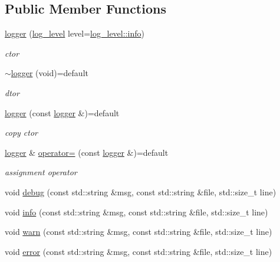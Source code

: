 \subsection*{Public Member Functions}
\begin{DoxyCompactItemize}
\item 
\hyperlink{classtacopie_1_1logger_af863301c0ef7f646469eb944285cb280}{logger} (\hyperlink{classtacopie_1_1logger_ae7dd235972bbf86a017fc39b3af80efe}{log\+\_\+level} level=\hyperlink{classtacopie_1_1logger_ae7dd235972bbf86a017fc39b3af80efeacaf9b6b99962bf5c2264824231d7a40c}{log\+\_\+level\+::info})
\begin{DoxyCompactList}\small\item\em ctor \end{DoxyCompactList}\item 
\hyperlink{classtacopie_1_1logger_af5c89b85935dbe3b4da3199247d50398}{$\sim$logger} (void)=default
\begin{DoxyCompactList}\small\item\em dtor \end{DoxyCompactList}\item 
\hyperlink{classtacopie_1_1logger_af22e5c126a0e0dbd4c82dc1c40b2d16f}{logger} (const \hyperlink{classtacopie_1_1logger}{logger} \&)=default
\begin{DoxyCompactList}\small\item\em copy ctor \end{DoxyCompactList}\item 
\hyperlink{classtacopie_1_1logger}{logger} \& \hyperlink{classtacopie_1_1logger_a4ee4e53fa0857ee404ddfd5b40759162}{operator=} (const \hyperlink{classtacopie_1_1logger}{logger} \&)=default
\begin{DoxyCompactList}\small\item\em assignment operator \end{DoxyCompactList}\item 
void \hyperlink{classtacopie_1_1logger_aff31bbc7d3fdbbe60a2331fe24ec76ff}{debug} (const std\+::string \&msg, const std\+::string \&file, std\+::size\+\_\+t line)
\item 
void \hyperlink{classtacopie_1_1logger_a5089c5a6127586d4f2ea3a69a0bf6570}{info} (const std\+::string \&msg, const std\+::string \&file, std\+::size\+\_\+t line)
\item 
void \hyperlink{classtacopie_1_1logger_aa4cd2ffc3f4b9d096a35c5c2aa8e0970}{warn} (const std\+::string \&msg, const std\+::string \&file, std\+::size\+\_\+t line)
\item 
void \hyperlink{classtacopie_1_1logger_a3fe1be02ac2f4e4fe44a0bdaf8359546}{error} (const std\+::string \&msg, const std\+::string \&file, std\+::size\+\_\+t line)
\end{DoxyCompactItemize}
